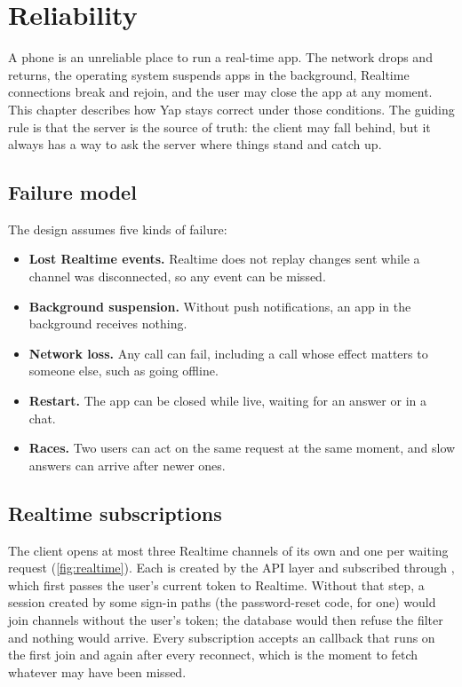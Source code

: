 \chapter{Reliability}
\label{ch:reliability}

A phone is an unreliable place to run a real-time app. The network drops and returns, the operating
system suspends apps in the background, Realtime connections break and rejoin, and the user may close the
app at any moment. This chapter describes how Yap stays correct under those conditions. The guiding rule
is that the server is the source of truth: the client may fall behind, but it always has a way to ask the
server where things stand and catch up.

\section{Failure model}

The design assumes five kinds of failure:

\begin{itemize}
  \item \textbf{Lost Realtime events.} Realtime does not replay changes sent while a channel was
    disconnected, so any event can be missed.
  \item \textbf{Background suspension.} Without push notifications, an app in the background receives
    nothing.
  \item \textbf{Network loss.} Any call can fail, including a call whose effect matters to someone else,
    such as going offline.
  \item \textbf{Restart.} The app can be closed while live, waiting for an answer or in a chat.
  \item \textbf{Races.} Two users can act on the same request at the same moment, and slow answers can
    arrive after newer ones.
\end{itemize}

\section{Realtime subscriptions}
\label{sec:realtime}

The client opens at most three Realtime channels of its own and one per waiting request
(\cref{fig:realtime}). Each is created by the API layer and subscribed through , which
first passes the user's current token to Realtime. Without that step, a session created by some sign-in
paths (the password-reset code, for one) would join channels without the user's token; the database would
then refuse the filter and nothing would arrive. Every subscription accepts an 
callback that runs on the first join and again after every reconnect, which is the moment to fetch
whatever may have been missed.

